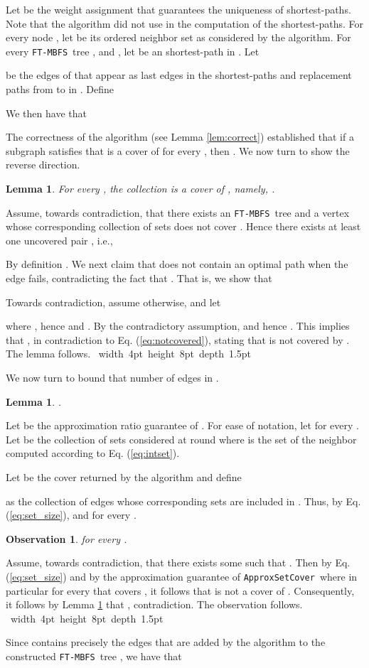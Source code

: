 \documentclass[12pt]{article}
\newtheorem{lemma}[theorem]{Lemma}
\newtheorem{observation}[theorem]{Observation}
\def\Proof{\par\noindent{\bf Proof:~}}
\def\blackslug{\hbox{\hskip 1pt \vrule width 4pt height 8pt
    depth 1.5pt \hskip 1pt}}
\def\QED{\quad\blackslug\lower 8.5pt\null\par}
\def\FTMBFS{\mbox{\tt FT-MBFS}}
\def\ApproxSetCover{\mbox{\tt ApproxSetCover}}
\begin{document}
Let  be the weight assignment that guarantees the uniqueness of shortest-paths. Note that the algorithm did not use  in the computation of the shortest-paths. For every node , let
 be its ordered neighbor set
as considered by the algorithm.
For every \FTMBFS\ tree
,  and , let  be an  shortest-path in . Let

be the edges of  that appear as last edges in the shortest-paths and replacement paths from  to  in .
Define

We then have that

The correctness of the algorithm (see Lemma \ref{lem:correct})
established that if a subgraph  satisfies that
 is a cover of
 for every , then .
We now turn to show the reverse direction.
\begin{lemma}
\label{lem:cover_tree}
For every , the collection  is a cover of , namely,
.
\end{lemma}
\Proof
Assume, towards contradiction, that there exists an \FTMBFS\ tree
 and a vertex 
whose corresponding collection of sets 
does not cover .
Hence there exists at least one uncovered pair , i.e.,

By definition . We next claim that  does not contain an optimal
 path when the edge  fails,
contradicting the fact that .
That is, we show that

Towards contradiction, assume otherwise, and let

where ,
hence 
and .
By the contradictory assumption, 
and hence .
This implies that , in contradiction to Eq. (\ref{eq:notcovered}),
stating that  is not covered by .
The lemma follows.
\QED
We now turn to bound that number of edges in .
\begin{lemma}
\label{lem:numbersize}
.
\end{lemma}
\Proof
Let  be the approximation
ratio guarantee of .
For ease of notation, let
 for every .
Let  be the collection of
 sets considered at round  where 
is the set of the neighbor  computed according to
Eq. (\ref{eq:intset}).
\par Let 
be the cover returned by the algorithm and define

as the collection of edges whose corresponding sets are included in
.
Thus, by Eq. (\ref{eq:set_size}),
 and  for every .
\begin{observation}
\label{cl:a_i}
 for every .
\end{observation}
\Proof
Assume, towards contradiction, that there exists some  such that
. Then by Eq. (\ref{eq:set_size})
and by the approximation guarantee of \ApproxSetCover\, where in
particular 
for every  that covers , it follows that  is not a cover of .
Consequently, it follows by Lemma \ref{lem:cover_tree}
that , contradiction.
The observation follows.
\QED
Since  contains precisely the edges that are added by the algorithm to the constructed \FTMBFS\ tree , we have that
\end{document}
